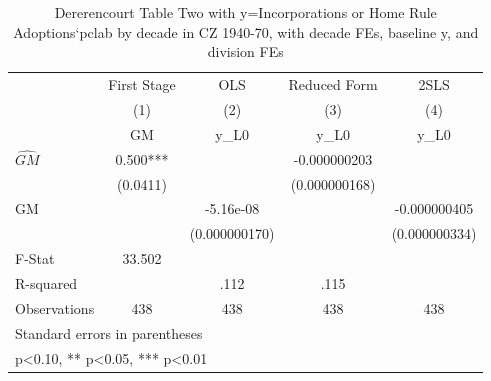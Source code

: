 \begin{table}[htbp]\centering
\def\sym#1{\ifmmode^{#1}\else\(^{#1}\)\fi}
\caption{Dererencourt Table Two with y=Incorporations or Home Rule Adoptions`pclab by decade in CZ 1940-70, with decade FEs, baseline y, and division FEs}
\begin{tabular}{l*{4}{c}}
\toprule
                    & First Stage   &         OLS   &Reduced Form   &        2SLS   \\
                    &\multicolumn{1}{c}{(1)}&\multicolumn{1}{c}{(2)}&\multicolumn{1}{c}{(3)}&\multicolumn{1}{c}{(4)}\\
                    &\multicolumn{1}{c}{GM}&\multicolumn{1}{c}{y\_L0}&\multicolumn{1}{c}{y\_L0}&\multicolumn{1}{c}{y\_L0}\\
\midrule
$\hat{GM}$          &       0.500***&               &-0.000000203   &               \\
                    &    (0.0411)   &               &(0.000000168)   &               \\
\addlinespace
GM                  &               &   -5.16e-08   &               &-0.000000405   \\
                    &               &(0.000000170)   &               &(0.000000334)   \\
\midrule
F-Stat              &      33.502   &               &               &               \\
R-squared           &               &        .112   &        .115   &               \\
Observations        &         438   &         438   &         438   &         438   \\
\bottomrule
\multicolumn{5}{l}{\footnotesize Standard errors in parentheses}\\
\multicolumn{5}{l}{\footnotesize * p<0.10, ** p<0.05, *** p<0.01}\\
\end{tabular}
\end{table}
